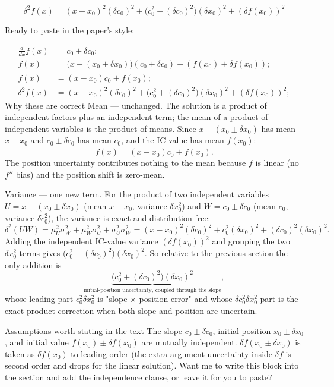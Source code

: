 \documentclass[twoside]{article}
\numberwithin{equation}{section}
\begin{document}
$$\delta^2 f(x) = (x-x_0)^2(\delta c_0)^2 + \big(c_0^2+(\delta c_0)^2\big)(\delta x_0)^2 + (\delta f(x_0))^2$$

Ready to paste in the paper's style:


\begin{align}
\label{eqn: first-order ODE}
\frac{d}{d x} f(x) &= c_0 \pm \delta c_0; \\
\label{eqn: first-order ODE solution}
f(x) &= \big(x - (x_0 \pm \delta x_0)\big) (c_0 \pm \delta c_0) + (f(x_0) \pm \delta f(x_0)); \\
\label{eqn: first-order ODE mean}
\overline{f(x)} &= (x - x_0) c_0 + \overline{f(x_0)}; \\
\label{eqn: first-order ODE variance}
\delta^2 f(x) &= (x - x_0)^2 (\delta c_0)^2 + \big(c_0^2 + (\delta c_0)^2\big) (\delta x_0)^2 + (\delta f(x_0))^2;
\end{align}
Why these are correct
Mean — unchanged. The solution is a product of independent factors plus an independent term; the mean of a product of independent variables is the product of means. Since $x-(x_0\pm\delta x_0)$ has mean $x-x_0$ and $c_0\pm\delta c_0$ has mean $c_0$, and the IC value has mean $\overline{f(x_0)}$:
$$\overline{f(x)}=(x-x_0)c_0+\overline{f(x_0)}.$$
The position uncertainty contributes nothing to the mean because $f$ is linear (no $f''$ bias) and the position shift is zero-mean.

Variance — one new term. For the product of two independent variables $U=x-(x_0\pm\delta x_0)$ (mean $x-x_0$, variance $\delta x_0^2$) and $W=c_0\pm\delta c_0$ (mean $c_0$, variance $\delta c_0^2$), the variance is exact and distribution-free:
$$\delta^2(UW)=\mu_U^2\sigma_W^2+\mu_W^2\sigma_U^2+\sigma_U^2\sigma_W^2=(x-x_0)^2(\delta c_0)^2+c_0^2(\delta x_0)^2+(\delta c_0)^2(\delta x_0)^2.$$
Adding the independent IC-value variance $(\delta f(x_0))^2$ and grouping the two $\delta x_0^2$ terms gives $\big(c_0^2+(\delta c_0)^2\big)(\delta x_0)^2$. So relative to the previous section the only addition is
$$\underbrace{\big(c_0^2+(\delta c_0)^2\big)(\delta x_0)^2}_{\text{initial-position uncertainty, coupled through the slope}},$$
whose leading part $c_0^2\delta x_0^2$ is "slope × position error" and whose $\delta c_0^2\delta x_0^2$ part is the exact product correction when both slope and position are uncertain.

Assumptions worth stating in the text
The slope $c_0\pm\delta c_0$, initial position $x_0\pm\delta x_0$, and initial value $f(x_0)\pm\delta f(x_0)$ are mutually independent.
$\delta f(x_0\pm\delta x_0)$ is taken as $\delta f(x_0)$ to leading order (the extra argument-uncertainty inside $\delta f$ is second order and drops for the linear solution).
Want me to write this block into the section and add the independence clause, or leave it for you to paste?
\end{document}
